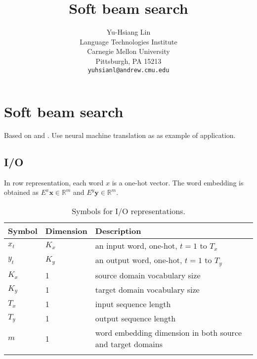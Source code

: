 \documentclass{article}
\title{Soft beam search}
\author{
	Yu-Hsiang Lin
		\\
	Language Technologies Institute\\
	Carnegie Mellon University\\
	Pittsburgh, PA 15213 \\
	\texttt{yuhsianl@andrew.cmu.edu} \\
}
\newcommand{\bb}[1]{\boldsymbol{#1}}
\begin{document}

\maketitle








\section{Soft beam search}

	Based on \cite{Goyal2018} and \cite{Bahdanau2015}. Use neural machine translation as as example of application.




\subsection{I/O}

	In row representation, each word $x$ is a one-hot vector. The word embedding is obtained as $E^x \bb{x} \in \mathbb{R}^m$ and $E^y \bb{y} \in \mathbb{R}^m$.


\begin{table}[!htb]
\centering
\begin{tabular}{lll}
\toprule
Symbol & Dimension & Description \\
\midrule
$x_t$ & $K_x$ & an input word, one-hot, $t = 1$ to $T_x$ \\
$y_t$ & $K_y$ & an output word, one-hot, $t = 1$ to $T_y$ \\
$K_x$ & 1 & source domain vocabulary size \\
$K_y$ & 1 & target domain vocabulary size \\
$T_x$ & 1 & input sequence length \\
$T_y$ & 1 & output sequence length \\
$m$ & 1 & word embedding dimension in both source and target domains \\
\bottomrule \\
\end{tabular}
\caption{Symbols for I/O representations.}
\label{tab:IOSymbol}
\end{table}
\end{document}

